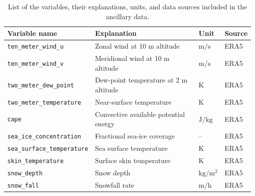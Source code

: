 \documentclass[11pt]{article}
\begin{document}
\begin{table}[htbp]
	\centering
	\caption{List of the variables, their explanations, units, and data sources included in the ancillary data.}
	\label{tab:ancillary}
	\begin{tabular}{lp{4cm}ll}
		\toprule
		\textbf{Variable name}                       & \textbf{Explanation}                                   & \textbf{Unit}                               & \textbf{Source} \\
		\midrule
		\texttt{ten\_meter\_wind\_u}                 & Zonal wind at 10 m altitude                            & $\si{\meter \per \second}$                  & ERA5            \\
		\texttt{ten\_meter\_wind\_v}                 & Meridional wind at 10 m altitude                       & $\si{\meter \per \second}$                  & ERA5            \\
		\texttt{two\_meter\_dew\_point}              & Dew-point temperature at 2 m altitude                  & $\si{\kelvin}$                              & ERA5            \\
		\texttt{two\_meter\_temperature}             & Near-surface temperature                               & $\si{\kelvin}$                              & ERA5            \\
		\texttt{cape}                                & Convective available potential energy                  & $\si{\joule \per \kilo \gram}$              & ERA5            \\
		\texttt{sea\_ice\_concentration}             & Fractional sea-ice coverage                            & --                                          & ERA5            \\
		\texttt{sea\_surface\_temperature}           & Sea surface temperature                                & $\si{\kelvin}$                              & ERA5            \\
		\texttt{skin\_temperature}                   & Surface skin temperature                               & $\si{\kelvin}$                              & ERA5            \\
		\texttt{snow\_depth}                         & Snow depth                                             & $\si{\kilo \gram \per \meter \squared}$     & ERA5            \\
		\texttt{snow\_fall}                          & Snowfall rate                                          & $\si{\meter \per \hour}$                    & ERA5            \\

\end{tabular}
\end{table}
\end{document}
